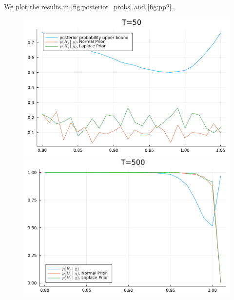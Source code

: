 \documentclass{article}
\theoremstyle{definition}
\theoremstyle{exercise}
\theoremstyle{remark}
\begin{document}
We plot the results in \autoref{fig:posterior_probs} and \ref{fig:pp2}.

\begin{figure}[H]
\centering
    \begin{minipage}{.5\textwidth}
        \centering
        \includegraphics[width=.95\linewidth]{./plots/posterior_probs_50.png}
    \end{minipage}%
    \begin{minipage}{.5\textwidth}
        \centering
        \includegraphics[width=.95\linewidth]{./plots/posterior_probs_500.png}
    \end{minipage}
        \label{fig:posterior_probs}
\end{figure}
\end{document}
